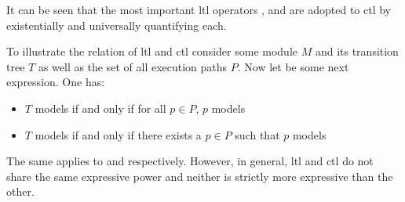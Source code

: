 It can be seen that the most important \gls{ltl} operators ,  and  are adopted to \gls{ctl} by existentially and universally quantifying each.

\begin{example}
    To illustrate the relation of \gls{ltl} and \gls{ctl} consider some module $ M $ and its transition tree $ T $ as well as the set of all execution paths $ P $.
    Now let  be some next expression.
    One has:
    \begin{itemize}
        \item $ T $ models  if and only if for all $ p \in P $, $ p $ models 
        \item $ T $ models  if and only if there exists a $ p \in P $ such that $ p $ models 
    \end{itemize}
    The same applies to  and  respectively.
    However, in general, \gls{ltl} and \gls{ctl} do not share the same expressive power and neither is strictly more expressive than the other.
\end{example}

